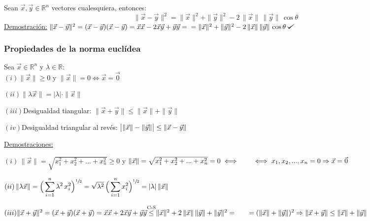 \documentclass[12pt, titlepage]{article}
\def\checkmark{\tikz\fill[scale=0.4](0,.35) -- (.25,0) -- (1,.7) -- (.25,.15) -- cycle;}
\newcommand{\leqc}[1]{\stackrel{\mathclap{\normalfont\mbox{\scriptsize{#1}}}}{\leq}}
\begin{document}
Sean $\vec{x}, \vec{y} \in \mathbb{R}^n$ vectores cualesquiera, entonces:
$$\boxed{\|\vec{x} - \vec{y}\|^2 = \|\vec{x}\|^2 + \|\vec{y}\|^2 - 2 \, \|\vec{x}\| \, \|\vec{y}\| \, \cos{\theta}}$$
\underline{Demostración:} $\|\vec{x} - \vec{y}\|^2 = (\vec{x} - \vec{y}) (\vec{x} - \vec{y}) = \vec{x} \vec{x} - 2 \vec{x} \vec{y} + \vec{y} \vec{y} = \vspace{1mm} \\ 
=\|\vec{x}\|^2 + \|\vec{y}\|^2 - 2 \, \|\vec{x}\| \, \|\vec{y}\| \, \cos{\theta} \, \checkmark$

\vspace{3mm}


\subsubsection*{Propiedades de la norma euclídea}
Sea $\vec{x} \in \mathbb{R}^n$ y $\lambda \in \mathbb{R}$: \\ 

$(i) \|\vec{x}\| \geq 0$ y $ \|\vec{x}\| = 0 \iff \vec{x} = \vec{0}$ \vspace{1mm}

$(ii) \| \lambda \vec{x}\| = |\lambda| \cdot \|\vec{x}\|$ \vspace{1mm}

$(iii)$Desigualdad tiangular: $\|\vec{x} + \vec{y}\| \leq \|\vec{x}\| + \|\vec{y}\|$ \vspace{1mm}

$(iv)$Desigualdad triangular al revés: $\big{|} \|\vec{x}\| - \|\vec{y}\|\big{|} \leq \|\vec{x}- \vec{y}\|$
\vspace{3mm}

\noindent\underline{Demostraciones:}\vspace{5mm}

$(i) \, \|\vec{x}\| = \sqrt{x_1^2 + x_2^2+...+ x_n^2} \geq 0$ y $ \|\vec{x}\| = \sqrt{x_1^2 + x_2^2 + ...+ x_n^2} = 0 \iff  \indent \iff x_1, x_2,..., x_n = 0 \Rightarrow \vec{x} = \vec{0}$

$(ii) \, \displaystyle \|\lambda \vec{x}\| = \Big{(} \sum_{i=1}^n \lambda ^2 \, x_i^2 \Big{)}^{\sfrac{1}{2}} = \sqrt{\lambda^2} \, \Big{(} \sum_{i=1}^n x_i^2 \Big{)}^{\sfrac{1}{2}} = |\lambda| \, \|\vec{x}\|$

$(iii) \|\vec{x} + \vec{y}\|^2 = (\vec{x} + \vec{y})(\vec{x} + \vec{y}) = \vec{x} \vec{x} + 2 \vec{x} \vec{y} + \vec{y} \vec{y} \leqc{C-S} \|\vec{x}\|^2 + 2 \, \|\vec{x}\| \, \|\vec{y}\| + \|\vec{y}\|^2 = \indent = (\|\vec{x}\| + \|\vec{y}\|)^2 \Rightarrow \|\vec{x} + \vec{y}\| \leq \|\vec{x}\| + \|\vec{y}\|$ \vspace{5mm}
\end{document}
